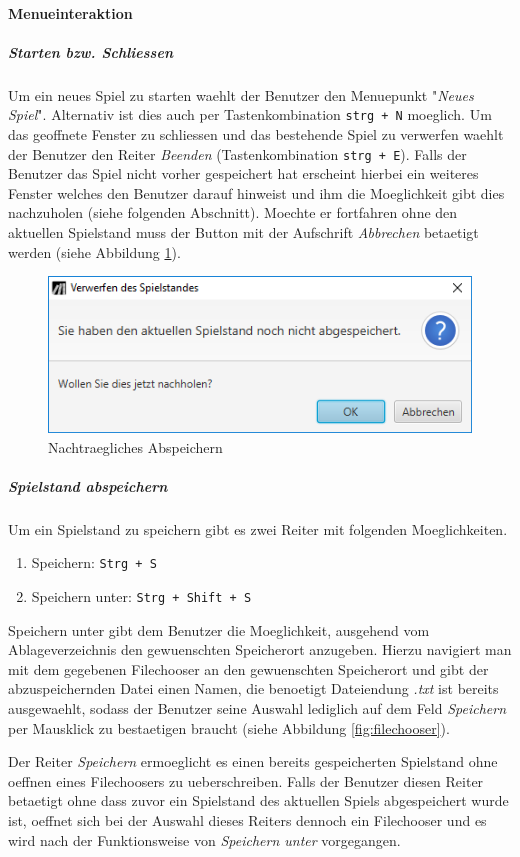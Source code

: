 \paragraph{Menueinteraktion}
\subparagraph{Starten bzw. Schliessen}
Um ein neues Spiel zu starten waehlt der Benutzer den Menuepunkt "\emph{Neues Spiel}". Alternativ ist dies auch per Tastenkombination \verb|strg + N| moeglich. Um das geoffnete Fenster zu schliessen und das bestehende Spiel zu verwerfen waehlt der Benutzer den Reiter \emph{Beenden} (Tastenkombination \verb|strg + E|). Falls der Benutzer das Spiel nicht vorher gespeichert hat erscheint hierbei ein weiteres Fenster welches den Benutzer darauf hinweist und ihm die Moeglichkeit gibt dies nachzuholen (siehe folgenden Abschnitt). Moechte er fortfahren ohne den aktuellen Spielstand muss der Button mit der Aufschrift \emph{Abbrechen} betaetigt werden (siehe Abbildung \ref{fig:nachtrSpeichern}). 

\begin{figure}
	\centering
	\includegraphics[width=.6\linewidth]{screenshots/screenshot_NachtraeglichesAbspeichern}
	\caption{Nachtraegliches Abspeichern}
	\label{fig:nachtrSpeichern}
\end{figure}

\subparagraph{Spielstand abspeichern}
Um ein Spielstand zu speichern gibt es zwei Reiter mit folgenden Moeglichkeiten.
\begin{enumerate}
	\item{Speichern: \verb|Strg + S|}
	\item{Speichern unter: \verb|Strg + Shift + S|}
\end{enumerate}
Speichern unter gibt dem Benutzer die Moeglichkeit, ausgehend vom Ablageverzeichnis den gewuenschten Speicherort anzugeben. Hierzu navigiert man mit dem gegebenen Filechooser an den gewuenschten Speicherort und gibt der abzuspeichernden Datei einen Namen, die benoetigt Dateiendung \emph{.txt} ist bereits ausgewaehlt, sodass der Benutzer seine Auswahl lediglich auf dem Feld \emph{Speichern} per Mausklick zu bestaetigen braucht (siehe Abbildung \ref{fig:filechooser}). 

Der Reiter \emph{Speichern} ermoeglicht es einen bereits gespeicherten Spielstand ohne oeffnen eines Filechoosers zu ueberschreiben. Falls der Benutzer diesen Reiter betaetigt ohne dass zuvor ein Spielstand des aktuellen Spiels abgespeichert wurde ist, oeffnet sich bei der Auswahl dieses Reiters dennoch ein Filechooser und es wird nach der Funktionsweise von \emph{Speichern unter} vorgegangen. 

